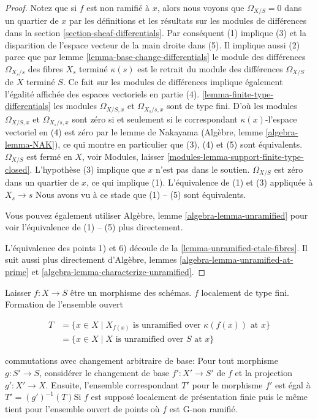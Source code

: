 \begin{proof}

Notez que si $f$ est non ramifié à $x$, alors nous voyons que $\Omega_{X/S} = 0$ dans un quartier de $x$
par les définitions et les résultats sur les modules de différences dans la section \ref{section-sheaf-differentials}. Par conséquent (1) implique (3) et la disparition de l'espace vecteur de la main droite dans (5). Il implique aussi (2) parce que par lemme \ref{lemma-base-change-differentials}
le module des différences $\Omega_{X_s/s}$ des fibres $X_s$
terminé $\kappa(s)$ est le retrait du module des différences
$\Omega_{X/S}$ de $X$ terminé $S$. Ce fait sur les modules de différences implique également l'égalité affichée des espaces vectoriels en partie (4). \ref{lemma-finite-type-differentials}
les modules $\Omega_{X/S, x}$ et $\Omega_{X_s/s, x}$ sont de type fini. D'où les modules $\Omega_{X/S, x}$ et $\Omega_{X_s/s, x}$ sont zéro si et seulement si le correspondant $\kappa(x)$-l'espace vectoriel en (4) est zéro par le lemme de Nakayama (Algèbre, lemme \ref{algebra-lemma-NAK}), ce qui montre en particulier que (3), (4) et (5) sont équivalents. $\Omega_{X/S}$ est fermé en $X$, voir Modules, laisser \ref{modules-lemma-support-finite-type-closed}. L'hypothèse (3) implique que $x$ n'est pas dans le soutien. $\Omega_{X/S}$ est zéro dans un quartier de $x$, ce qui implique (1). L'équivalence de (1) et (3) appliquée à $X_s \to s$
Nous avons vu à ce stade que (1) -- (5) sont équivalents.

\medskip\noindent
Vous pouvez également utiliser Algèbre, lemme \ref{algebra-lemma-unramified} pour voir l'équivalence de (1) -- (5) plus directement.

\medskip\noindent

L'équivalence des points 1) et 6) découle de la
\ref{lemma-unramified-etale-fibres}. Il suit aussi plus directement d'Algèbre, lemmes \ref{algebra-lemma-unramified-at-prime} et
\ref{algebra-lemma-characterize-unramified}.

\end{proof}

\begin{lemma}

\label{lemma-set-points-where-fibres-unramified}

Laisser $f : X \to S$ être un morphisme des schémas. $f$ localement de type fini. Formation de l'ensemble ouvert

\begin{align*}
T
& =
\{x \in X \mid X_{f(x)}\text{ is unramified over }\kappa(f(x))\text{ at }x\} \\
& =
\{x \in X \mid X\text{ is unramified over }S\text{ at }x\}
\end{align*}

commutations avec changement arbitraire de base: Pour tout morphisme $g : S' \to S$, considérer le changement de base $f' : X' \to S'$ de $f$ et la projection $g' : X' \to X$. Ensuite, l'ensemble correspondant $T'$ pour le morphisme $f'$ est égal à $T' = (g')^{-1}(T)$Si $f$ est supposé localement de présentation finie puis le même tient pour l'ensemble ouvert de points où $f$ est G-non ramifié.

\end{lemma}

